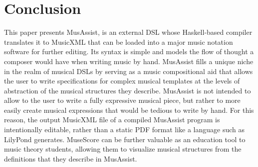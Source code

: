 \documentclass{article}
\begin{document}
\section{Conclusion}

This paper presents MusAssist, is an external DSL whose Haskell-based compiler translates it to MusicXML that can be loaded into a major music notation software for further editing. Its syntax is simple and models the flow of thought a composer would have when writing music by hand. MusAssist fills a unique niche in the realm of musical DSLs by serving as a music compositional aid that allows the user to write specifications for complex musical templates at the levels of abstraction of the musical structures they describe. MusAssist is not intended to allow to the user to write a fully expressive musical piece, but rather to more easily create musical expressions that would be tedious to write by hand. For this reason, the output MusicXML file of a compiled MusAssist program is intentionally editable, rather than a static PDF format like a language such as LilyPond generates. MuseScore can be further valuable as an education tool to music theory students, allowing them to visualize musical structures from the definitions that they describe in MusAssist.
\end{document}
